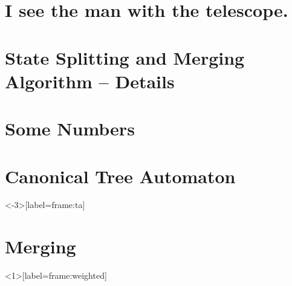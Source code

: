\documentclass{beamer}
\begin{document}
\begin{frame}{\secname}
	\printbibliography
\end{frame}


\section{I see the man with the telescope.}

\begin{frame}{\secname}
	\centering
	
\end{frame}


\section{State Splitting and Merging Algorithm – Details}


\begin{frame}{\secname}
	\centering
	
\end{frame}


\section{Some Numbers}

\begin{frame}{\secname}
	
\end{frame}


\section{Canonical Tree Automaton}

\begin{frame}{\secname}
	\centering%
	
\end{frame}


\begin{frame}<-3>[label=frame:ta]{\secname}
	
\end{frame}


\section{Merging}



\begin{frame}<1>[label=frame:weighted]{\secname}
	
\end{frame}
\end{document}
